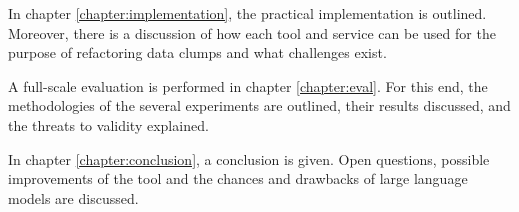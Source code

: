In chapter \ref{chapter:implementation}, the practical implementation is outlined.  Moreover, there is a discussion of how each tool and service can be used for the purpose of refactoring data clumps and what challenges exist. 

A full-scale evaluation is performed in chapter \ref{chapter:eval}. For this end, the methodologies of the several experiments  are outlined, their results discussed, and the threats to validity explained. 

In chapter \ref{chapter:conclusion}, a conclusion is given. Open questions, possible improvements of the tool and the chances and drawbacks of large language models are discussed.